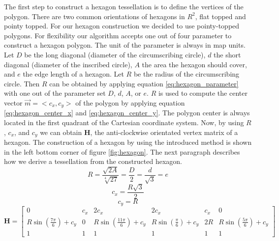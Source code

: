 		The first step to construct a hexagon tessellation is to define the vertices of the polygon. There are two common orientations of hexagons in $R^2$, flat topped and pointy topped. For our hexagon construction we decided to use pointy-topped polygons. For flexibility our algorithm accepts one out of four parameter to construct a hexagon polygon. The unit of the parameter is always in map units. Let $D$ be the long diagonal (diameter of the circumscribing circle), $d$ the short diagonal (diameter of the inscribed circle), $A$ the area the hexagon should cover, and $e$ the edge length of a hexagon. Let $R$ be the radius of the circumscribing circle. Then $R$ can be obtained by applying equation \ref{eq:hexagon_parameter} with one out of the parameter set $D$, $d$, $A$, or $e$. $R$ is used to compute the center vector $\vec{m}=<c_x, c_y>$ of the polygon by applying equation \ref{eq:hexagon_center_x} and \ref{eq:hexagon_center_y}. The polygon center is always located in the first quadrant of the Cartesian coordinate system. Now, by using $R$, $c_x$, and $c_y$ we can obtain $\mathbf{H}$, the anti-clockwise orientated vertex matrix of a hexagon. The construction of a hexagon by using the introduced method is shown in the left bottom corner of figure \ref{fig:hexagon}. The next paragraph describes how we derive a tessellation from the constructed hexagon.
		\begin{equation}
		\label{eq:hexagon_parameter}
			R = \frac{\sqrt{2A}}{\sqrt[4]{27}} = \frac{D}{2} = \frac{d}{\sqrt{3}} = e
		\end{equation}
		\begin{equation}
		\label{eq:hexagon_center_x}
			c_x = \frac{R\sqrt{3}}{2} 
		\end{equation}
		\begin{equation}
		\label{eq:hexagon_center_y}
			c_y = R
		\end{equation}
		\begin{equation}
		\label{eq:hexagon_matrix}
			\mathbf{H} =
			\begin{bmatrix}
				0 & c_x & 2c_x & 2c_x & c_x & 0 \\
				R\sin\left(\frac{7\pi}{6}\right) + c_y & 0 & R\sin\left(\frac{11\pi}{6}\right)+c_y & R\sin\left(\frac{\pi}{6}\right)+c_y & 2R & R\sin\left(\frac{5\pi}{6}\right)+c_y \\
				1 & 1 & 1 & 1 & 1 & 1
			\end{bmatrix}
		\end{equation}
